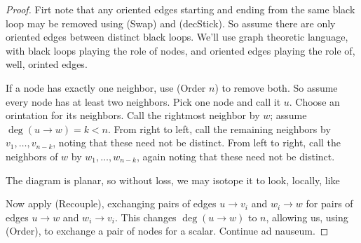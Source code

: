 \begin{proof}
    Firt note that any oriented edges starting and ending from the same black loop may be removed
    using (Swap) and (decStick).
    So assume there are only oriented edges between distinct black loops.
    We'll use graph theoretic language, with black loops playing the role of nodes,
    and oriented edges playing the role of, well, orinted edges.

    If a node has exactly one neighbor, use (Order $n$) to remove both.
    So assume every node has at least two neighbors.
    Pick one node and call it $u$.
    Choose an orintation for its neighbors.
    Call the rightmost neighbor by $w$;
    assume $\deg(u\to w)=k<n$.
    From right to left, call the remaining neighbors by $v_1,\dots,v_{n-k}$, noting that
    these need not be distinct.
    From left to right, call the neighbors of $w$ by $w_1,\dots,w_{n-k}$, again noting that 
    these need not be distinct.

    The diagram is planar, so without loss, we may isotope it to look, locally, like
    \begin{center}
    \end{center}

    Now apply (Recouple), exchanging pairs of edges $u\to v_i$ and $w_i \to w$ for pairs of edges $u\to w$ and $w_i\to v_i$.
    This changes $\deg(u\to w)$ to $n$, allowing us, using (Order), to exchange a pair of nodes for a scalar.
    Continue ad nauseum.
\end{proof}








